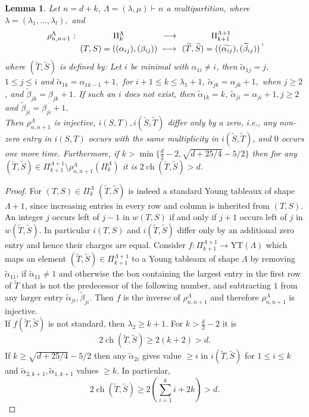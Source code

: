 \documentclass[11pt,a4paper]{amsart}
\newcommand{\abb}[5]{%
\setlength{\arraycolsep}{0.4ex}%
\begin{array}{rcccc}%
#1 &:\,& #2 & \,\,\longrightarrow\,\, & #3 \\[0.5ex]%
     & & #4 & \longmapsto & #5%
\end{array}%
}
\numberwithin{equation}{section}
\newtheorem{lemma}[thm]{Lemma}
\theoremstyle{definition}
\DeclareMathOperator{\ch}{ch}
\numberwithin{thm}{section}
\theoremstyle{break}
\numberwithin{subcase}{case}
\begin{document}
\begin{lemma} \label{le:lemma4}
Let $n=d+k$, $\Lambda = (\lambda,\mu)\vdash n$ a multipartition, where $\lambda=(\lambda_1,\ldots,\lambda_l),$ and $$ \abb{\rho_{n,n+1}^\Lambda}{\Pi^\Lambda_{k}}{\Pi^{\Lambda+1}_{k+1}}{(T,S)=((\alpha_{ij}),(\beta_{ij}))}{(\widetilde{T},\widetilde{S})=((\widetilde{\alpha_{ij}}),(\widetilde{\beta}_{ij}))},$$ where $(\widetilde{T},\widetilde{S})$ is defined by: Let $i$ be minimal with $\alpha_{1i} \neq i$, then $\widetilde{\alpha}_{1j}=j,$ $1 \leq j \leq i$ and $\widetilde{\alpha}_{1k}=\alpha_{1k-1}+1,$ for $ i+1 \leq k \leq \lambda_1+1$, $\widetilde{\alpha}_{jk} = \alpha_{jk}+1,$ when $j \geq 2$, and $\widetilde{\beta}_{jk}=\beta_{jk}+1$. If such an $i$ does not exist, then $\widetilde{\alpha}_{1k}=k$, $\widetilde{\alpha}_{ji} =\alpha_{ji}+1, j \geq 2$ and $\widetilde{\beta}_{ji}= \beta_{ji}+1$. \\
Then $\rho_{n,n+1}^{\Lambda}$ is injective, $i(S,T), i(\widetilde{S},\widetilde{T})$ differ only by a zero, i.e., any non-zero entry in $i(S,T)$ occurs with the same multiplicity in $i(\widetilde{S},\widetilde{T})$, and $0$ occurs one more time. Furthermore, if $k > \min\{  \frac{d}{2} -2,\sqrt{d+25/4}-5/2\}$ then for any $(\widetilde{T},\widetilde{S}) \in \Pi^{\Lambda+1}_{k+1} \setminus \rho_{n,n+1}^\Lambda (\Pi^\Lambda_{k})$ it is $2\ch (\widetilde{T},\widetilde{S}) > d$.
\end{lemma}
\begin{proof}
For $(T,S) \in \Pi_{k}^\Lambda$ $(\widetilde{T},\widetilde{S})$ is indeed a standard Young tableaux of shape $\Lambda +1$, since increasing entries in every row and column is inherited from $(T,S)$. An integer $j$ occurs left of $j-1$ in $w(T,S)$ if and only if $j+1$ occurs left of $j$ in $w(\widetilde{T},\widetilde{S})$. In particular $i(T,S)$ and $i(\widetilde{T},\widetilde{S})$ differ only by an additional zero entry and hence their charges are equal.
Consider $f : \Pi_{k+1}^{\Lambda +1} \rightarrow \text{YT}(\Lambda)$ which maps an element $(\widetilde{T},\widetilde{S}) \in \Pi_{k+1}^{\Lambda +1}$ to a Young tableaux of shape $\Lambda$ by removing $\widetilde{\alpha}_{11}$, if $\widetilde{\alpha}_{11} \neq 1$ and otherwise the box containing the largest entry in the first row of $\widetilde{T}$ that is not the predecessor of the following number, and subtracting $1$ from any larger entry $\widetilde{\alpha}_{ji},\widetilde{\beta}_{ji}$. Then $f$ is the inverse of $\rho_{n,n+1}^\Lambda$ and therefore $\rho_{n,n+1}^\Lambda$ is injective. \\
If $f(\widetilde{T},\widetilde{S})$ is not standard, then $\lambda_2 \geq k+1$. For $k > \frac{d}{2} -2$ it is $$2\ch (\widetilde{T},\widetilde{S}) \geq 2(k+2) > d.$$ If $k \geq \sqrt{d+25/4}-5/2$ then any $\widetilde{\alpha}_{2i}$ gives value $\geq i$ in $i(\widetilde{T},\widetilde{S})$ for $1 \leq i \leq k$ and $\widetilde{\alpha}_{2,k+1},\widetilde{\alpha}_{1,k+1}$ values $\geq k$. In particular, $$ 2\ch(\widetilde{T},\widetilde{S}) \geq 2(\sum_{i=1}^k i +2k) > d.$$ 
\end{proof}
\end{document}
